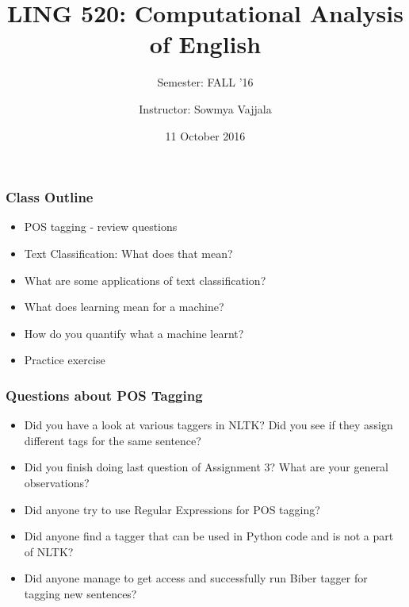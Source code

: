 \documentclass{beamer}
\author[Sowmya Vajjala]{Instructor: Sowmya Vajjala}
\title[LING 520]{LING 520: Computational Analysis of English}
\subtitle{Semester: FALL '16}
\date{11 October 2016}
\institute{Iowa State University, USA}
\begin{document}
\begin{frame}\titlepage
\end{frame}

\begin{frame}
\frametitle{Class Outline}
\begin{itemize}
\item POS tagging - review questions
\item Text Classification: What does that mean?
\item  What are some applications of text classification?
\item  What does learning mean for a machine?
\item How do you quantify what a machine learnt? 
\item Practice exercise
\end{itemize}
\end{frame}

\begin{frame}
\frametitle{Questions about POS Tagging}
\begin{itemize}
\item Did you have a look at various taggers in NLTK? Did you see if they assign different tags for the same sentence? \pause
\item Did you finish doing last question of Assignment 3? What are your general observations? \pause
\item Did anyone try to use Regular Expressions for POS tagging? \pause
\item Did anyone find a tagger that can be used in Python code and is not a part of NLTK? \pause
\item Did anyone manage to get access and successfully run Biber tagger for tagging new sentences? 
\end{itemize}
\end{frame}
\end{document}
